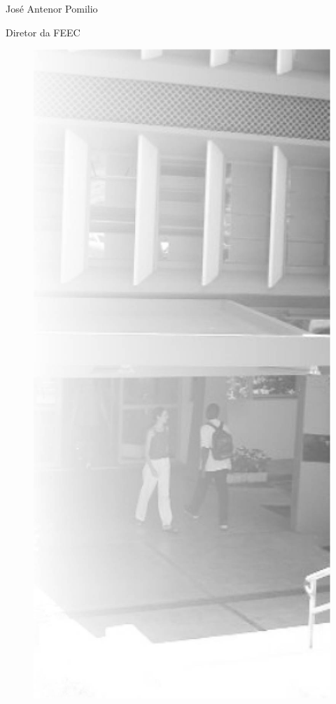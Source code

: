José Antenor Pomilio

Diretor da FEEC


\begin{figure}[t]
    \centering
    \includegraphics[width=.35\textwidth]{img/ola_mundo/feec.jpg}
\end{figure}
